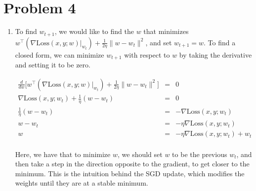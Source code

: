 \documentclass[12pt]{article}
\begin{document}
\section*{Problem 4}
\begin{enumerate}[label=(\alph*)]
  \item To find $w_{t+1}$, we would like to find the $w$ that minimizes $w^\top \left(\left. \nabla \text{Loss}(x,y; w)\right|_{w_t}\right) + \frac{1}{2 \eta}\| w - w_t \|^2$, and set $w_{t+1}=w$. To find a closed form, we can minimize $w_{t+1}$ with respect to $w$ by taking the derivative and setting it to be zero.

  \begin{eqnarray*}
  \frac{d}{dw}\biggl[w^\top \left(\left. \nabla \text{Loss}(x,y; w)\right|_{w_t}\right) + \frac{1}{2 \eta}\| w - w_t \|^2\biggr] &=& 0\\
  \left. \nabla \text{Loss}(x,y; w_t)\right. + \frac{1}{\eta}(w - w_t) &=& 0\\
  \frac{1}{\eta} (w - w_t) &=& -\left. \nabla \text{Loss}(x,y; w_t)\right.\\
  w - w_t  &=& -\eta\left. \nabla \text{Loss}(x,y; w_t)\right.\\
  w &=& -\eta\left. \nabla \text{Loss}(x,y; w_t)\right.+ w_t  \\
  \end{eqnarray*}

  Here, we have that to minimize $w$, we should set $w$ to be the previous $w_t$, and then take a step in the direction opposite to the gradient, to get closer to the minimum. This is the intuition behind the SGD update, which modifies the weights until they are at a stable minimum.
\end{enumerate}
\end{document}
